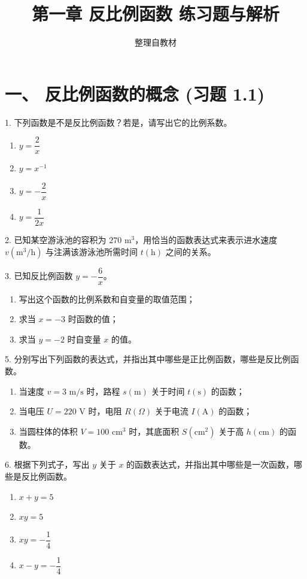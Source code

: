 \documentclass[12pt, a4paper]{article}
\title{\textbf{\zihao{2} 第一章 反比例函数 练习题与解析}}
\author{整理自教材}
\date{}
\begin{document}
\maketitle

\section*{一、 反比例函数的概念 (习题 1.1)}

\begin{questionbox}[基础巩固]
1. 下列函数是不是反比例函数？若是，请写出它的比例系数。
\begin{enumerate}[label=(\arabic*)]
    \item $y = \dfrac{2}{x}$
    \item $y = x^{-1}$
    \item $y = -\dfrac{2}{x}$
    \item $y = \dfrac{1}{2x}$
\end{enumerate}
\end{questionbox}

\begin{questionbox}[应用建模]
2. 已知某空游泳池的容积为 $270 \text{ m}^3$，用恰当的函数表达式来表示进水速度 $v (\text{m}^3/\text{h})$ 与注满该游泳池所需时间 $t (\text{h})$ 之间的关系。
\end{questionbox}

\begin{questionbox}[函数性质]
3. 已知反比例函数 $y = -\dfrac{6}{x}$。
\begin{enumerate}[label=(\arabic*)]
    \item 写出这个函数的比例系数和自变量的取值范围；
    \item 求当 $x = -3$ 时函数的值；
    \item 求当 $y = -2$ 时自变量 $x$ 的值。
\end{enumerate}
\end{questionbox}

\begin{questionbox}[B组 拓展提升]
5. 分别写出下列函数的表达式，并指出其中哪些是正比例函数，哪些是反比例函数。
\begin{enumerate}[label=(\arabic*)]
    \item 当速度 $v = 3 \text{ m/s}$ 时，路程 $s (\text{m})$ 关于时间 $t (\text{s})$ 的函数；
    \item 当电压 $U = 220 \text{ V}$ 时，电阻 $R (\Omega)$ 关于电流 $I (\text{A})$ 的函数；
    \item 当圆柱体的体积 $V = 100 \text{ cm}^3$ 时，其底面积 $S (\text{cm}^2)$ 关于高 $h (\text{cm})$ 的函数。
\end{enumerate}

6. 根据下列式子，写出 $y$ 关于 $x$ 的函数表达式，并指出其中哪些是一次函数，哪些是反比例函数。
\begin{enumerate}[label=(\arabic*)]
    \item $x + y = 5$
    \item $xy = 5$
    \item $xy = -\dfrac{1}{4}$
    \item $x - y = -\dfrac{1}{4}$
\end{enumerate}
\end{questionbox}
\end{document}
